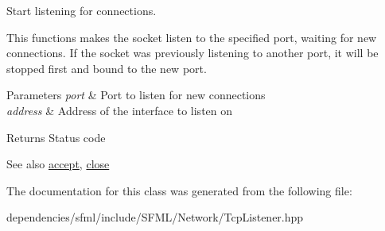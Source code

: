 Start listening for connections. 

This functions makes the socket listen to the specified port, waiting for new connections. If the socket was previously listening to another port, it will be stopped first and bound to the new port.


\begin{DoxyParams}{Parameters}
{\em port} & Port to listen for new connections \\
\hline
{\em address} & Address of the interface to listen on\\
\hline
\end{DoxyParams}
\begin{DoxyReturn}{Returns}
Status code
\end{DoxyReturn}
\begin{DoxySeeAlso}{See also}
\hyperlink{classsf_1_1_tcp_listener_ae2c83ce5a64d50b68180c46bef0a7346}{accept}, \hyperlink{classsf_1_1_tcp_listener_a3a00a850506bd0f9f48867a0fe59556b}{close} 
\end{DoxySeeAlso}


The documentation for this class was generated from the following file\+:\begin{DoxyCompactItemize}
\item 
dependencies/sfml/include/\+S\+F\+M\+L/\+Network/Tcp\+Listener.\+hpp\end{DoxyCompactItemize}
